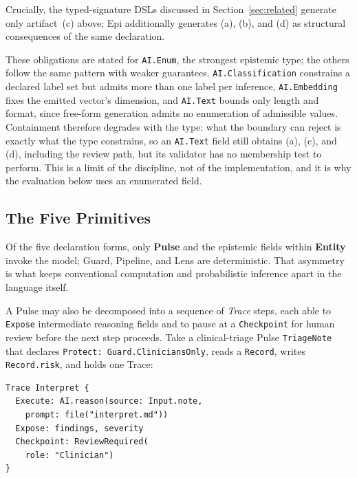 \documentclass[sigconf]{acmart}
\begin{document}
Crucially, the typed-signature DSLs discussed in Section~\ref{sec:related} generate only artifact~(c) above; Epi additionally generates (a), (b), and (d) as structural consequences of the same declaration.

These obligations are stated for \texttt{AI.Enum}, the strongest epistemic type; the others follow the same pattern with weaker guarantees. \texttt{AI.Classification} constrains a declared label set but admits more than one label per inference, \texttt{AI.Embedding} fixes the emitted vector's dimension, and \texttt{AI.Text} bounds only length and format, since free-form generation admits no enumeration of admissible values. Containment therefore degrades with the type: what the boundary can reject is exactly what the type constrains, so an \texttt{AI.Text} field still obtains (a), (c), and (d), including the review path, but its validator has no membership test to perform. This is a limit of the discipline, not of the implementation, and it is why the evaluation below uses an enumerated field.

\subsection{The Five Primitives}
\label{sec:primitives}

Of the five declaration forms, only \textbf{Pulse} and the epistemic fields within \textbf{Entity} invoke the model; Guard, Pipeline, and Lens are deterministic. That asymmetry is what keeps conventional computation and probabilistic inference apart in the language itself.

A Pulse may also be decomposed into a sequence of \emph{Trace} steps, each able to \texttt{Expose} intermediate reasoning fields and to pause at a \texttt{Checkpoint} for human review before the next step proceeds. Take a clinical-triage Pulse \texttt{TriageNote} that declares \texttt{Protect:\ Guard.CliniciansOnly}, reads a \texttt{Record}, writes \texttt{Record.risk}, and holds one Trace:

\begin{verbatim}
Trace Interpret {
  Execute: AI.reason(source: Input.note,
    prompt: file("interpret.md"))
  Expose: findings, severity
  Checkpoint: ReviewRequired(
    role: "Clinician")
}
\end{verbatim}
\end{document}
